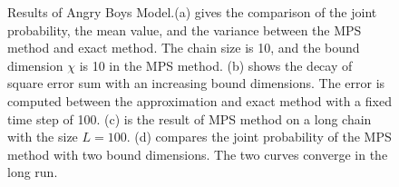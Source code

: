 \begin{figure}[htbp]
  \caption{Results of Angry Boys Model.(a) gives the comparison of the joint probability, the mean value, and the variance between the MPS method and exact method. The chain size is 10, and the bound dimension $\chi$ is 10 in the MPS method. (b) shows the decay of square error sum with an increasing bound dimensions. The error is computed between the approximation and exact method with a fixed time step of 100. (c) is the result of MPS method on a long chain with the size $L=100$. (d) compares the joint probability of the MPS method with two bound dimensions. The two curves converge in the long run.}
  \label{fig:Angry_result}
\end{figure}

